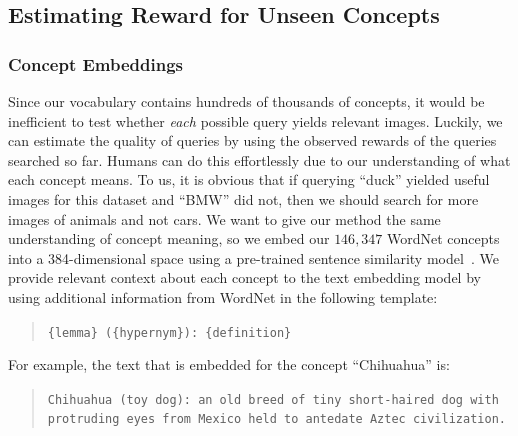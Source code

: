 \subsection{Estimating Reward for Unseen Concepts}
\label{subsec:unseen_reward}

\subsubsection{Concept Embeddings}
Since our vocabulary contains hundreds of thousands of concepts, it would be inefficient to test whether \emph{each} possible query yields relevant images. Luckily, we can estimate the quality of queries by using the observed rewards of the queries searched so far. Humans can do this effortlessly due to our understanding of what each concept means. To us, it is obvious that if querying ``duck'' yielded useful images for this dataset and ``BMW'' did not, then we should search for more images of animals and not cars. We want to give our method the same understanding of concept meaning, so we embed our $146{,}347$ WordNet concepts into a 384-dimensional space using a pre-trained sentence similarity model~\cite{reimers2019sentence}. We provide relevant context about each concept to the text embedding model by using additional information from WordNet in the following template:

\begin{quote}
    {\tt {\small \{lemma\} (\{hypernym\}): \{definition\}}}
\end{quote}
For example, the text that is embedded for the concept ``Chihuahua'' is:

\begin{quote}
    {\tt {\small Chihuahua (toy dog): an old breed of tiny short-haired dog with protruding eyes from Mexico held to antedate Aztec civilization.}}
\end{quote}


